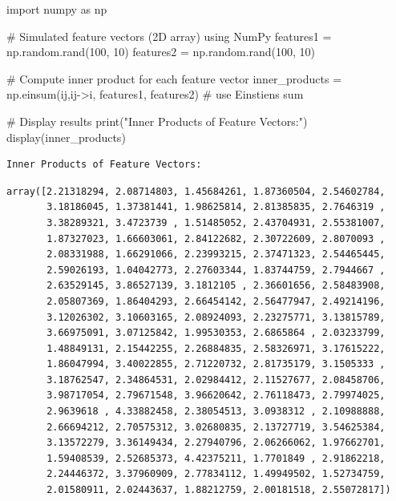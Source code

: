 \documentclass[
  letterpaper,
  DIV=11,
  numbers=noendperiod]{scrreprt}
\newenvironment{Shaded}{\begin{snugshade}}{\end{snugshade}}
\newcommand{\BuiltInTok}[1]{\textcolor[rgb]{0.00,0.23,0.31}{#1}}
\newcommand{\CommentTok}[1]{\textcolor[rgb]{0.37,0.37,0.37}{#1}}
\newcommand{\DecValTok}[1]{\textcolor[rgb]{0.68,0.00,0.00}{#1}}
\newcommand{\ImportTok}[1]{\textcolor[rgb]{0.00,0.46,0.62}{#1}}
\newcommand{\NormalTok}[1]{\textcolor[rgb]{0.00,0.23,0.31}{#1}}
\newcommand{\OperatorTok}[1]{\textcolor[rgb]{0.37,0.37,0.37}{#1}}
\newcommand{\StringTok}[1]{\textcolor[rgb]{0.13,0.47,0.30}{#1}}
\theoremstyle{plain}
\theoremstyle{definition}
\theoremstyle{remark}
\begin{document}
\begin{Shaded}
\begin{Highlighting}[]
\ImportTok{import}\NormalTok{ numpy }\ImportTok{as}\NormalTok{ np}

\CommentTok{\# Simulated feature vectors (2D array) using NumPy}
\NormalTok{features1 }\OperatorTok{=}\NormalTok{ np.random.rand(}\DecValTok{100}\NormalTok{, }\DecValTok{10}\NormalTok{)}
\NormalTok{features2 }\OperatorTok{=}\NormalTok{ np.random.rand(}\DecValTok{100}\NormalTok{, }\DecValTok{10}\NormalTok{)}

\CommentTok{\# Compute inner product for each feature vector}
\NormalTok{inner\_products }\OperatorTok{=}\NormalTok{ np.einsum(}\StringTok{\textquotesingle{}ij,ij{-}\textgreater{}i\textquotesingle{}}\NormalTok{, features1, features2) }\CommentTok{\# use Einstien\textquotesingle{}s sum}

\CommentTok{\# Display results}
\BuiltInTok{print}\NormalTok{(}\StringTok{"Inner Products of Feature Vectors:"}\NormalTok{)}
\NormalTok{display(inner\_products)}
\end{Highlighting}
\end{Shaded}

\begin{verbatim}
Inner Products of Feature Vectors:
\end{verbatim}

\begin{verbatim}
array([2.21318294, 2.08714803, 1.45684261, 1.87360504, 2.54602784,
       3.18186045, 1.37381441, 1.98625814, 2.81385835, 2.7646319 ,
       3.38289321, 3.4723739 , 1.51485052, 2.43704931, 2.55381007,
       1.87327023, 1.66603061, 2.84122682, 2.30722609, 2.8070093 ,
       2.08331988, 1.66291066, 2.23993215, 2.37471323, 2.54465445,
       2.59026193, 1.04042773, 2.27603344, 1.83744759, 2.7944667 ,
       2.63529145, 3.86527139, 3.1812105 , 2.36601656, 2.58483908,
       2.05807369, 1.86404293, 2.66454142, 2.56477947, 2.49214196,
       3.12026302, 3.10603165, 2.08924093, 2.23275771, 3.13815789,
       3.66975091, 3.07125842, 1.99530353, 2.6865864 , 2.03233799,
       1.48849131, 2.15442255, 2.26884835, 2.58326971, 3.17615222,
       1.86047994, 3.40022855, 2.71220732, 2.81735179, 3.1505333 ,
       3.18762547, 2.34864531, 2.02984412, 2.11527677, 2.08458706,
       3.98717054, 2.79671548, 3.96620642, 2.76118473, 2.79974025,
       2.9639618 , 4.33882458, 2.38054513, 3.0938312 , 2.10988888,
       2.66694212, 2.70575312, 3.02680835, 2.13727719, 3.54625384,
       3.13572279, 3.36149434, 2.27940796, 2.06266062, 1.97662701,
       1.59408539, 2.52685373, 4.42375211, 1.7701849 , 2.91862218,
       2.24446372, 3.37960909, 2.77834112, 1.49949502, 1.52734759,
       2.01580911, 2.02443637, 1.88212759, 2.00181518, 2.55072817])
\end{verbatim}
\end{document}
